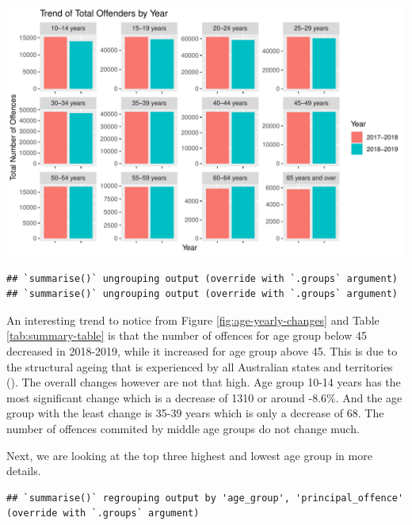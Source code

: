 \documentclass[11pt,a4paper,]{article}
\let\origfigure\figure
\let\endorigfigure\endfigure
\renewenvironment{figure}[1][2] {
\expandafter\origfigure\expandafter[H]
} {
\endorigfigure
}
\begin{document}
\begin{figure}
\centering
\includegraphics{ETC5513-Assignment4_files/figure-latex/age-yearly-changes-1.pdf}
\caption{\label{fig:age-yearly-changes}Distribution of total offenders yearly}
\end{figure}

\begin{verbatim}
## `summarise()` ungrouping output (override with `.groups` argument)
## `summarise()` ungrouping output (override with `.groups` argument)
\end{verbatim}

An interesting trend to notice from Figure \ref{fig:age-yearly-changes} and Table \ref{tab:summary-table} is that the number of offences for age group below 45 decreased in 2018-2019, while it increased for age group above 45. This is due to the structural ageing that is experienced by all Australian states and territories (\textcite{AIC}). The overall changes however are not that high. Age group 10-14 years has the most significant change which is a decrease of 1310 or around -8.6\%. And the age group with the least change is 35-39 years which is only a decrease of 68. The number of offences commited by middle age groups do not change much.

Next, we are looking at the top three highest and lowest age group in more details.

\begin{verbatim}
## `summarise()` regrouping output by 'age_group', 'principal_offence' (override with `.groups` argument)
\end{verbatim}
\end{document}
